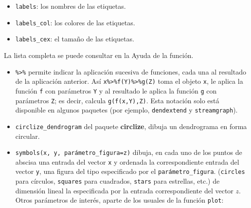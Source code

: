 \documentclass[
]{book}
\providecommand{\tightlist}{%
  \setlength{\itemsep}{0pt}\setlength{\parskip}{0pt}}
\theoremstyle{definition}
\theoremstyle{definition}
\theoremstyle{definition}
\theoremstyle{remark}
\begin{document}
\begin{itemize}
  \begin{itemize}
  \tightlist
  \item
    \texttt{labels}: los nombres de las etiquetas.
  \item
    \texttt{labels\_col}: los colores de las etiquetas.
  \item
    \texttt{labels\_cex}: el tamaño de las etiquetas.
  \end{itemize}
\end{itemize}

La lista completa se puede consultar en la Ayuda de la función.

\begin{itemize}
\item
  \texttt{\%\textgreater{}\%} permite indicar la aplicación sucesiva de funciones, cada una al resultado de la aplicación anterior. Así
  \texttt{x\%\textgreater{}\%f(Y)\%\textgreater{}\%g(Z)}
  toma el objeto \texttt{x}, le aplica la función \texttt{f} con parámetros \texttt{Y} y al resultado le aplica la función \texttt{g} con parámetros \texttt{Z}; es decir, calcula \texttt{g(f(x,Y),Z)}. Esta notación solo está disponible en algunos paquetes (por ejemplo, \texttt{dendextend} y \texttt{streamgraph}).
\item
  \texttt{circlize\_dendrogram} del paquete \textbf{circlize}, dibuja un dendrograma en forma circular.
\item
  \texttt{symbols(x,\ y,\ parámetro\_figura=z)} dibuja, en cada uno de los puntos de abscisa una entrada del vector \texttt{x} y ordenada la correspondiente entrada del vector \texttt{y}, una figura del tipo especificado por el \texttt{parámetro\_figura}.
  (\texttt{circles} para círculos, \texttt{squares} para cuadrados, \texttt{stars} para estrellas, etc.)
  de dimensión lineal la especificada por la entrada correspondiente del vector \(z\). Otros parámetros de interés, aparte de los usuales de la función \texttt{plot}:


\end{itemize}
\end{document}
